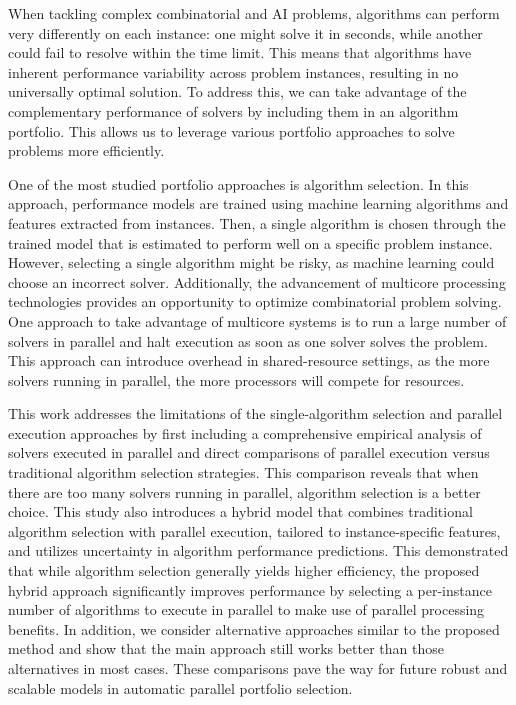 \documentclass[12pt]{book}                  %
\begin{document}

\thesisCommitteePage

\begin{thesisabstract}

When tackling complex combinatorial and AI problems, algorithms can perform very differently on each instance: one might solve it in seconds, while another could fail to resolve within the time limit. This means that algorithms have inherent performance variability across problem instances, resulting in no universally optimal solution. To address this, we can take advantage of the complementary performance of solvers by including them in an algorithm portfolio. This allows us to leverage various portfolio approaches to solve problems more efficiently. 

One of the most studied portfolio approaches is algorithm selection. In this approach, performance models are trained using machine learning algorithms and features extracted from instances. Then, a single algorithm is chosen through the trained model that is estimated to perform well on a specific problem instance. However, selecting a single algorithm might be risky, as machine learning could choose an incorrect solver. Additionally, the advancement of multicore processing technologies provides an opportunity to optimize combinatorial problem solving. One approach to take advantage of multicore systems is to run a large number of solvers in parallel and halt execution as soon as one solver solves the problem. This approach can introduce overhead in shared-resource settings, as the more solvers running in parallel, the more processors will compete for resources. 

This work addresses the limitations of the single-algorithm selection and parallel execution approaches by first including a comprehensive empirical analysis of solvers executed in parallel and direct comparisons of parallel execution versus traditional algorithm selection strategies. This comparison reveals that when there are too many solvers running in parallel, algorithm selection is a better choice. This study also introduces a hybrid model that combines traditional algorithm selection with parallel execution, tailored to instance-specific features, and utilizes uncertainty in algorithm performance predictions. This demonstrated that while algorithm selection generally yields higher efficiency, the proposed hybrid approach significantly improves performance by selecting a per-instance number of algorithms to execute in parallel to make use of parallel processing benefits. In addition, we consider alternative approaches similar to the proposed method and show that the main approach still works better than those alternatives in most cases. These comparisons pave the way for future robust and scalable models in automatic parallel portfolio selection. 

\end{thesisabstract}
\end{document}
